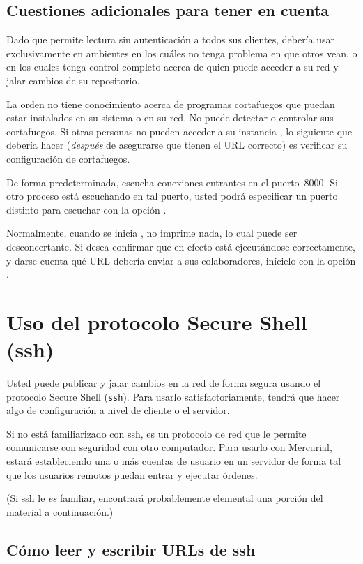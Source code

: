\subsection{Cuestiones adicionales para tener en cuenta}

Dado que permite lectura sin autenticación a todos sus clientes,
debería usar  exclusivamente en ambientes en los cuáles
no tenga problema en que otros vean, o en los cuales tenga control
completo acerca de quien puede acceder a su red y jalar cambios de su
repositorio.

La orden  no tiene conocimiento acerca de programas
cortafuegos que puedan estar instalados en su sistema o en su red. No
puede detectar o controlar sus cortafuegos.  Si otras personas no
pueden acceder a su instancia , lo siguiente que debería hacer
(\emph{después} de asegurarse que tienen el URL correcto) es verificar
su configuración de cortafuegos.

De forma predeterminada,  escucha conexiones entrantes en
el puerto~8000.  Si otro proceso está escuchando en tal puerto, usted
podrá especificar un puerto distinto para escuchar con la opción
.

Normalmente, cuando se inicia , no imprime nada, lo cual
puede ser desconcertante.  Si desea confirmar que en efecto está
ejecutándose correctamente, y darse cuenta qué URL debería enviar a
sus colaboradores, inícielo con la opción .

\section{Uso del protocolo Secure Shell (ssh)}
\label{sec:collab:ssh}

Usted puede publicar y jalar cambios en la red de forma segura usando
el protocolo Secure Shell (\texttt{ssh}).  Para usarlo satisfactoriamente,
tendrá que hacer algo de configuración a nivel de cliente o el
servidor.

Si no está familiarizado con ssh, es un protocolo de red que le permite
comunicarse con seguridad con otro computador.  Para usarlo con
Mercurial, estará estableciendo una o más cuentas de usuario en un
servidor de forma tal que los usuarios remotos puedan entrar y
ejecutar órdenes.

(Si ssh le \emph{es} familiar, encontrará probablemente elemental una
porción del material a continuación.)

\subsection{Cómo leer y escribir URLs de ssh}

